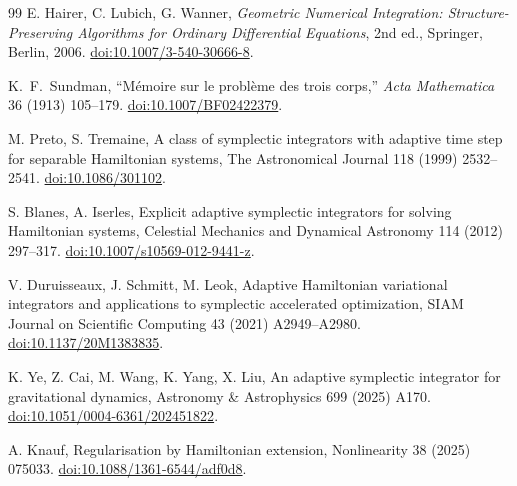 \documentclass[final,3p,times]{elsarticle}
\begin{document}

\begin{thebibliography}{99}
E. Hairer, C. Lubich, G. Wanner,
\emph{Geometric Numerical Integration: Structure-Preserving Algorithms
for Ordinary Differential Equations}, 2nd ed., Springer, Berlin, 2006.
\href{https://doi.org/10.1007/3-540-30666-8}{doi:10.1007/3-540-30666-8}.

K.~F.~Sundman,
``M\'emoire sur le probl\`eme des trois corps,''
\emph{Acta Mathematica} 36 (1913) 105--179.
\href{https://doi.org/10.1007/BF02422379}{doi:10.1007/BF02422379}.

M. Preto, S. Tremaine,
A class of symplectic integrators with adaptive time step for separable
Hamiltonian systems,
The Astronomical Journal 118 (1999) 2532--2541.
\href{https://doi.org/10.1086/301102}{doi:10.1086/301102}.

S. Blanes, A. Iserles,
Explicit adaptive symplectic integrators for solving Hamiltonian systems,
Celestial Mechanics and Dynamical Astronomy 114 (2012) 297--317.
\href{https://doi.org/10.1007/s10569-012-9441-z}{doi:10.1007/s10569-012-9441-z}.

V. Duruisseaux, J. Schmitt, M. Leok,
Adaptive Hamiltonian variational integrators and applications to symplectic
accelerated optimization,
SIAM Journal on Scientific Computing 43 (2021) A2949--A2980.
\href{https://doi.org/10.1137/20M1383835}{doi:10.1137/20M1383835}.

K. Ye, Z. Cai, M. Wang, K. Yang, X. Liu,
An adaptive symplectic integrator for gravitational dynamics,
Astronomy \& Astrophysics 699 (2025) A170.
\href{https://doi.org/10.1051/0004-6361/202451822}{doi:10.1051/0004-6361/202451822}.

A. Knauf, Regularisation by Hamiltonian extension,
Nonlinearity 38 (2025) 075033.
\href{https://doi.org/10.1088/1361-6544/adf0d8}{doi:10.1088/1361-6544/adf0d8}.


\end{thebibliography}
\end{document}
